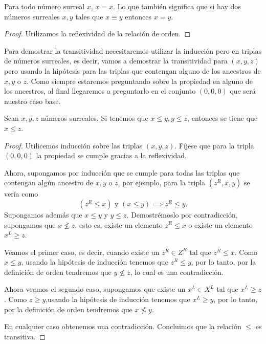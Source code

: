     \begin{corollary}
        Para todo n\'umero surreal $x$, $x = x$. Lo que tambi\'en significa que si hay dos n\'umeros surreales $x,y$ tales que $x\equiv y$ entonces $x = y$.
    \end{corollary}

    \begin{proof}
        Utilizamos la reflexividad de la relaci\'on de orden.
    \end{proof}

    Para demostrar la transitividad necesitaremos utilizar la inducci\'on pero en triplas de n\'umeros surreales, es decir, vamos a demostrar la transitividad para $(x,y,z)$ pero usando la hip\'otesis para las triplas que contengan alguno de los ancestros de $x,y$ o $z$. Como siempre estaremos preguntando sobre la propiedad en alguno de los ancestros, al final llegaremos a preguntarlo en el conjunto $(0,0,0)$ que ser\'a nuestro caso base.

    \begin{theorem}[Transitividad]
        Sean $x,y,z$ n\'umeros surreales. Si tenemos que $x\le y, y\le z$, entonces se tiene que $x\le z$.
    \end{theorem}

    \begin{proof}
        Utilicemos inducci\'on sobre las triplas $(x,y,z)$. F\'ijese que para la tripla $(0,0,\allowbreak 0)$ la propiedad se cumple gracias a la reflexividad.
        

        Ahora, supongamos por inducci\'on que se cumple para todas las triplas que contengan alg\'un ancestro de $x,y$ o $z$, por ejemplo, para la tripla $(z^R, x, y)$ se ver\'ia como
        \[
            (z^R \le x)\text{ y }(x \le y)\implies z^R\le y.
        \]
        Supongamos adem\'as que $x\le y$ y $y\le z$. Demostr\'emoslo por contradicci\'on, supongamos que $x\not\le z$, esto es, existe un elemento $z^R \le x$ o existe un elemento $x^L \ge z$.

        Veamos el primer caso, es decir, cuando existe un $z^R\in Z^R$ tal que $z^R \le x$. Como $x \le y$, usando la hip\'otesis de inducci\'on tenemos que $z^R \le y$, por lo tanto, por la definici\'on de orden tendremos que $y \not\le z$, lo cual es una contradicci\'on.

        Ahora veamos el segundo caso, supongamos que existe un $x^L\in X^L$ tal que $x^L \ge z$. Como $z \ge y$,usando la hip\'otesis de inducci\'on tenemos que $x^L \ge y$, por lo tanto, por la definici\'on de orden tendremos que $x\not\le y$.

        En cualquier caso obtenemos una contradicci\'on. Concluimos que la relaci\'on $\le$ es transitiva.
    \end{proof}

